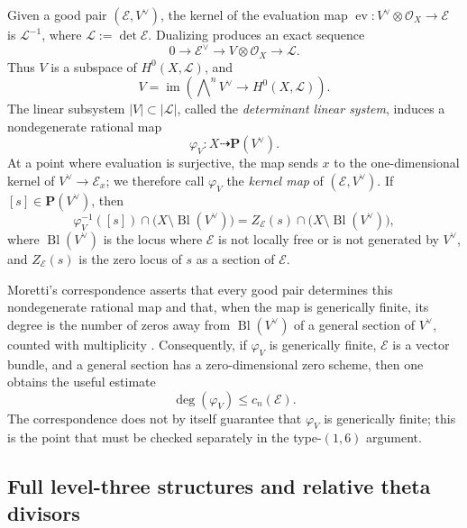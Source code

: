 \documentclass[12pt]{amsart}
\numberwithin{equation}{section}
\theoremstyle{definition}
\theoremstyle{remark}
\newcommand{\PP}{\mathbf P}
\begin{document}
Given a good pair $(\mathcal E,V^\vee)$, the kernel of the evaluation
map $\operatorname{ev}:V^\vee\otimes\mathcal O_X\to\mathcal E$ is
$\mathcal L^{-1}$, where $\mathcal L:=\det\mathcal E$.  Dualizing
produces an exact sequence
\begin{equation*}
  0\longrightarrow\mathcal E^\vee\longrightarrow
  V\otimes\mathcal O_X\longrightarrow\mathcal L.
\end{equation*}
Thus $V$ is a subspace of $H^0(X,\mathcal L)$, and
\[
 V=\operatorname{im}\!\left(
       \bigwedge\nolimits^n V^\vee
       \longrightarrow H^0(X,\mathcal L)\right).
\]
The linear subsystem $|V|\subset|\mathcal L|$, called the \emph{determinant linear system}, induces a nondegenerate
rational map
\[
  \varphi_V:X\dashrightarrow\PP(V^\vee).
\]
At a point where evaluation is surjective, the map sends $x$ to the
one-dimensional kernel of $V^\vee\to\mathcal E_x$; we therefore call
$\varphi_V$ the \emph{kernel map} of $(\mathcal E,V^\vee)$.  If
$[s]\in\PP(V^\vee)$, then
\begin{equation}\label{fiber_formula}
  \varphi_V^{-1}([s])\cap\bigl(X\setminus\operatorname{Bl}(V^\vee)\bigr)
  =Z_{\mathcal E}(s)\cap
   \bigl(X\setminus\operatorname{Bl}(V^\vee)\bigr),
\end{equation}
where $\operatorname{Bl}(V^\vee)$ is the locus where $\mathcal E$ is not
locally free or is not generated by $V^\vee$, and $Z_{\mathcal E}(s)$
is the zero locus of $s$ as a section of $\mathcal E$.

Moretti's correspondence asserts that every good pair determines this
nondegenerate rational map and that, when the map is generically finite,
its degree is the number of zeros away from
$\operatorname{Bl}(V^\vee)$ of a general section of $V^\vee$, counted
with multiplicity \cite[Proposition~1.5]{Moretti}.  Consequently, if
$\varphi_V$ is generically finite, $\mathcal E$ is a vector bundle, and
a general section has a
zero-dimensional zero scheme, then one obtains the useful estimate
\[
  \deg(\varphi_V)\leq c_n(\mathcal E).
\]
The correspondence does not by itself guarantee that $\varphi_V$ is
generically finite; this is the point that must be checked separately in
the type-$(1,6)$ argument.

\subsection{Full level-three structures and relative theta divisors}
\label{subsec:level-structures}
\end{document}
